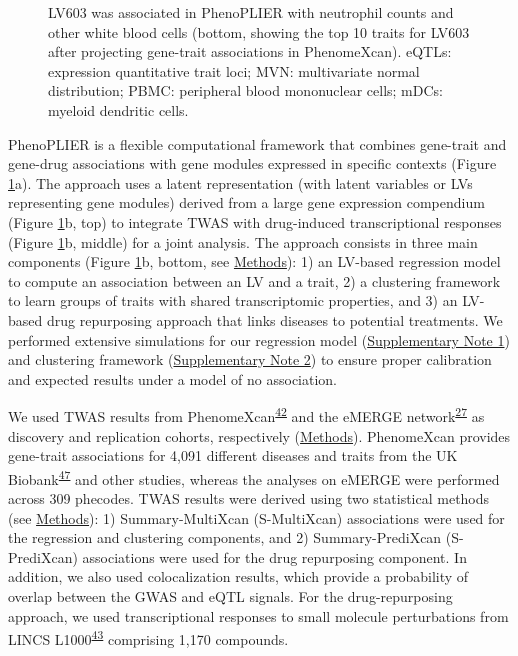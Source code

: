 \documentclass[
  a4paper,
]{article}
\begin{document}
\begin{figure}
{{LV603 was associated in PhenoPLIER with neutrophil counts and other white blood cells (bottom, showing the top 10 traits for LV603 after projecting gene-trait associations in PhenomeXcan).
eQTLs: expression quantitative trait loci;
MVN: multivariate normal distribution;
PBMC: peripheral blood mononuclear cells;
mDCs: myeloid dendritic cells.}\label{fig:entire_process}
}
\end{figure}

PhenoPLIER is a flexible computational framework that combines gene-trait and gene-drug associations with gene modules expressed in specific contexts (Figure \ref{fig:entire_process}a).
The approach uses a latent representation (with latent variables or LVs representing gene modules) derived from a large gene expression compendium (Figure \ref{fig:entire_process}b, top) to integrate TWAS with drug-induced transcriptional responses (Figure \ref{fig:entire_process}b, middle) for a joint analysis.
The approach consists in three main components (Figure \ref{fig:entire_process}b, bottom, see \protect\hyperlink{sec:methods}{Methods}):
1) an LV-based regression model to compute an association between an LV and a trait,
2) a clustering framework to learn groups of traits with shared transcriptomic properties,
and 3) an LV-based drug repurposing approach that links diseases to potential treatments.
We performed extensive simulations for our regression model (\protect\hyperlink{sm:reg:null_sim}{Supplementary Note 1}) and clustering framework (\protect\hyperlink{sm:clustering:null_sim}{Supplementary Note 2}) to ensure proper calibration and expected results under a model of no association.

We used TWAS results from PhenomeXcan\textsuperscript{\protect\hyperlink{ref-lY5ln3dB}{42}} and the eMERGE network\textsuperscript{\protect\hyperlink{ref-gZAOkumx}{27}} as discovery and replication cohorts, respectively (\protect\hyperlink{sec:methods:twas}{Methods}).
PhenomeXcan provides gene-trait associations for 4,091 different diseases and traits from the UK Biobank\textsuperscript{\protect\hyperlink{ref-nmJxPpE5}{47}} and other studies, whereas the analyses on eMERGE were performed across 309 phecodes.
TWAS results were derived using two statistical methods (see \protect\hyperlink{sec:methods:predixcan}{Methods}):
1) Summary-MultiXcan (S-MultiXcan) associations were used for the regression and clustering components,
and 2) Summary-PrediXcan (S-PrediXcan) associations were used for the drug repurposing component.
In addition, we also used colocalization results, which provide a probability of overlap between the GWAS and eQTL signals.
For the drug-repurposing approach, we used transcriptional responses to small molecule perturbations from LINCS L1000\textsuperscript{\protect\hyperlink{ref-F7lIlh2N}{43}} comprising 1,170 compounds.
\end{document}

